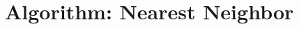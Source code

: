 \documentclass[12pt]{article}
\begin{document}

% 

% 

% 

\newpage
\section*{Algorithm: Nearest Neighbor}





\end{document}
